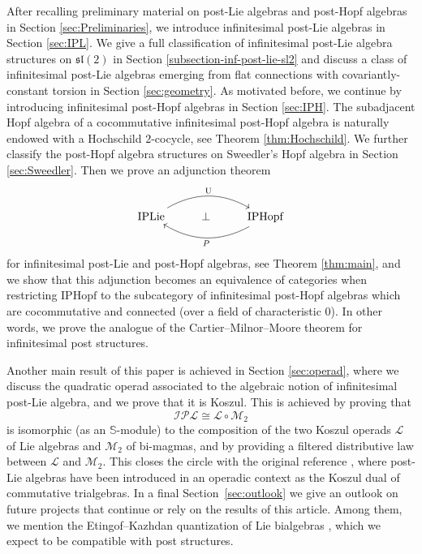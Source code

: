 \documentclass[10pt]{article}
\theoremstyle{definition}
\begin{document}
	\medskip
	After recalling preliminary material on post-Lie algebras and post-Hopf algebras in Section \ref{sec:Preliminaries}, we introduce infinitesimal post-Lie algebras in Section \ref{sec:IPL}. We give a full classification of infinitesimal post-Lie algebra structures on $\mathfrak{sl}(2)$ in Section \ref{subsection-inf-post-lie-sl2} and discuss a class of infinitesimal post-Lie algebras emerging from flat connections with covariantly-constant torsion in Section \ref{sec:geometry}. As motivated before, we continue by introducing infinitesimal post-Hopf algebras in Section \ref{sec:IPH}. The subadjacent Hopf algebra of a cocommutative infinitesimal post-Hopf algebra is naturally endowed with a Hochschild $2$-cocycle, see Theorem \ref{thm:Hochschild}. We further classify the post-Hopf algebra structures on Sweedler's Hopf algebra in Section \ref{sec:Sweedler}. Then we prove an adjunction theorem 
	\begin{equation}
		\begin{tikzcd}
			\mathrm{IPLie} \arrow[rr, bend left, "\mathrm{U}"] & \perp & \mathrm{IPHopf} \arrow[ll, bend left, "P"]
		\end{tikzcd}
	\end{equation}
	for infinitesimal post-Lie and post-Hopf algebras, see Theorem \ref{thm:main}, and we show that this adjunction becomes an equivalence of categories when restricting $\mathrm{IPHopf}$ to the subcategory of infinitesimal post-Hopf algebras which are cocommutative and connected (over a field of characteristic $0$). In other words, we prove the analogue of the Cartier--Milnor--Moore theorem for infinitesimal post structures. 
    
    Another main result of this paper is achieved in Section \ref{sec:operad}, where we discuss the quadratic operad associated to the algebraic notion of infinitesimal post-Lie algebra, and we prove that it is Koszul. This is achieved by proving that 
    $$
    \mathcal{IPL}\cong\mathscr{L}\circ\mathscr{M}_2
    $$
    is isomorphic (as an $\mathbb{S}$-module) to the composition of the two Koszul operads $\mathscr{L}$ of Lie algebras and $\mathscr{M}_2$ of bi-magmas, and by providing a filtered distributive law between $\mathscr{L}$ and $\mathscr{M}_2$. This closes the circle with the original reference \cite{Vallette}, where post-Lie algebras have been introduced in an operadic context as the Koszul dual of commutative trialgebras. In a final Section~\ref{sec:outlook} we give an outlook on future projects that continue or rely on the results of this article. Among them, we mention the Etingof--Kazhdan quantization of Lie bialgebras \cite{EK}, which we expect to be compatible with post structures.
\end{document}
